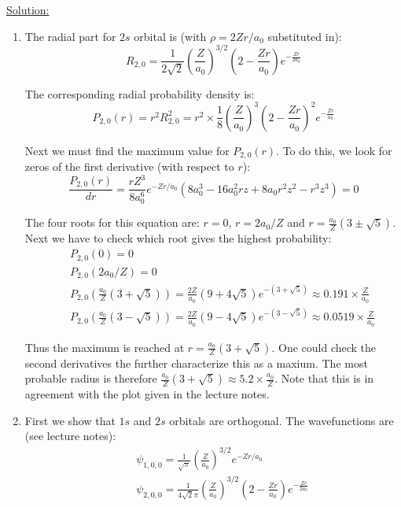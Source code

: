 \noindent
\underline{Solution:}\\

\begin{enumerate}
\item The radial part for $2s$ orbital is (with $\rho = 2Zr/a_0$ substituted in):
$$R_{2,0} = \frac{1}{2\sqrt{2}}\left(\frac{Z}{a_0}\right)^{3/2}\left(2 - \frac{Zr}{a_0}\right)e^{-\frac{Zr}{2a_0}}$$

The corresponding radial probability density is:
$$P_{2,0}(r) = r^2R^2_{2,0} = r^2\times\frac{1}{8}\left(\frac{Z}{a_0}\right)^3\left(2 - \frac{Zr}{a_0}\right)^2e^{-\frac{Zr}{a_0}}$$

Next we must find the maximum value for $P_{2,0}(r)$. To do this, we look for zeros of the first derivative (with respect to $r$):
$$\frac{P_{2,0}(r)}{dr} = \frac{rZ^3}{8a_0^6}e^{-Zr/a_0}\left(8a_0^3 - 16a_0^2rz + 8a_0r^2z^2 - r^3z^3\right) = 0$$

The four roots for this equation are: $r = 0$, $r = 2a_0/Z$ and $r = \frac{a_0}{Z}\left(3 \pm \sqrt{5}\right)$. Next we have to check which root gives the highest probability:
\begin{eqnarray}
\nonumber
& & P_{2,0}(0) = 0\\
\nonumber
& & P_{2,0}(2a_0/Z) = 0\\
\nonumber
& & P_{2,0}\left(\frac{a_0}{Z}\left(3 + \sqrt{5}\right)\right) = \frac{2Z}{a_0}\left(9 + 4\sqrt{5}\right)e^{-(3 + \sqrt{5})}\approx 0.191\times \frac{Z}{a_0}\\
\nonumber
& & P_{2,0}\left(\frac{a_0}{Z}\left(3 - \sqrt{5}\right)\right) = \frac{2Z}{a_0}\left(9 - 4\sqrt{5}\right)e^{-(3 - \sqrt{5})}\approx 0.0519\times \frac{Z}{a_0}
\end{eqnarray}

Thus the maximum is reached at $r = \frac{a_0}{Z}\left(3 + \sqrt{5}\right)$. One could check the second derivatives the further characterize this as a maxium. The most probable radius is therefore $\frac{a_0}{Z}\left(3 + \sqrt{5}\right)\approx 5.2\times\frac{a_0}{Z}$. Note that this is in agreement with the plot given in the lecture notes.

\item First we show that $1s$ and $2s$ orbitals are orthogonal. The wavefunctions are (see lecture notes):
\begin{eqnarray}
\nonumber
& & \psi_{1,0,0} = \frac{1}{\sqrt{\pi}}\left(\frac{Z}{a_0}\right)^{3/2}e^{-Zr/a_0}\\
\nonumber
& & \psi_{2,0,0} = \frac{1}{4\sqrt{2}\pi}\left(\frac{Z}{a_0}\right)^{3/2}\left(2 - \frac{Zr}{a_0}\right)e^{-\frac{Zr}{2a_0}}
\end{eqnarray}


\end{enumerate}
